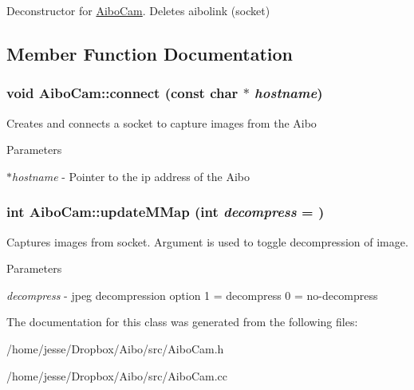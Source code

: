 Deconstructor for \hyperlink{classAiboCam}{AiboCam}. Deletes aibolink (socket) 

\subsection{Member Function Documentation}
\hypertarget{classAiboCam_aa450f46c7d0bfc09ec6f6b16cb42fdc6}{
\subsubsection[{connect}]{\setlength{\rightskip}{0pt plus 5cm}void AiboCam::connect (const char $\ast$ {\em hostname})}}
\label{classAiboCam_aa450f46c7d0bfc09ec6f6b16cb42fdc6}
Creates and connects a socket to capture images from the Aibo 
\begin{DoxyParams}{Parameters}
\item[{\em $\ast$hostname}]-\/ Pointer to the ip address of the Aibo \end{DoxyParams}
\hypertarget{classAiboCam_a72162af9d25b9b24d6449d41b234f8b2}{
\subsubsection[{updateMMap}]{\setlength{\rightskip}{0pt plus 5cm}int AiboCam::updateMMap (int {\em decompress} = {})}}
\label{classAiboCam_a72162af9d25b9b24d6449d41b234f8b2}
Captures images from socket. Argument is used to toggle decompression of image. 
\begin{DoxyParams}{Parameters}
\item[{\em decompress}]-\/ jpeg decompression option 1 = decompress 0 = no-\/decompress \end{DoxyParams}


The documentation for this class was generated from the following files:\begin{DoxyCompactItemize}
\item 
/home/jesse/Dropbox/Aibo/src/AiboCam.h\item 
/home/jesse/Dropbox/Aibo/src/AiboCam.cc\end{DoxyCompactItemize}
